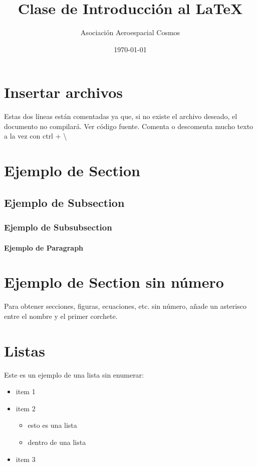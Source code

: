 \documentclass{article} %
\title{Clase de Introducción al \LaTeX}
\author{Asociación Aeroespacial Cosmos}
\date{\today} %
\begin{document}
\maketitle
\tableofcontents

\section{Insertar archivos}
Estas dos líneas están comentadas ya que, si no existe el archivo deseado, el documento no compilará. Ver código fuente. Comenta o descomenta mucho texto a la vez con ctrl + \textbackslash

\section{Ejemplo de Section}
\subsection{Ejemplo de Subsection}
\subsubsection{Ejemplo de Subsubsection}
\paragraph{Ejemplo de Paragraph}
\section*{Ejemplo de Section sin número}
Para obtener secciones, figuras, ecuaciones, etc. sin número, añade un asterisco entre el nombre y el primer corchete.

\section{Listas}
Este es un ejemplo de una lista sin enumerar:
\begin{itemize}
    \item item 1
    \item item 2
        \begin{itemize}
            \item esto es una lista
            \item dentro de una lista
        \end{itemize}
    \item item 3
\end{itemize}
\end{document}
